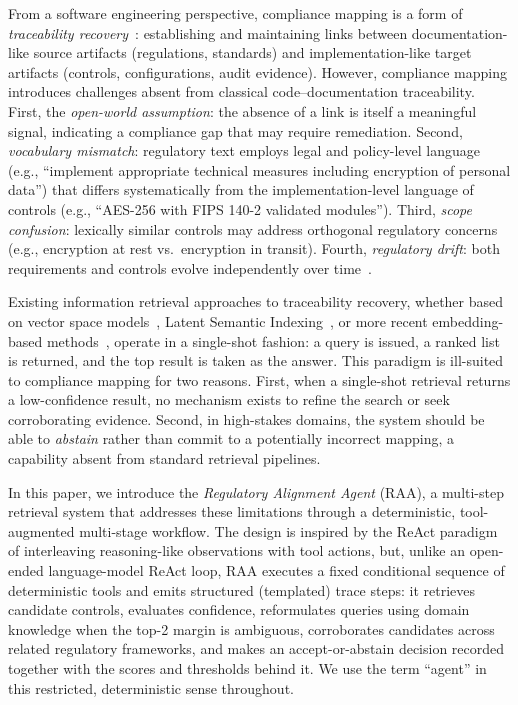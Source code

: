 \documentclass[a4paper,fleqn]{cas-sc}
\begin{document}
From a software engineering perspective, compliance mapping is a form of \emph{traceability recovery}~\citep{Borg2014,Cleland-Huang2014}: establishing and maintaining links between documentation-like source artifacts (regulations, standards) and implementation-like target artifacts (controls, configurations, audit evidence).
However, compliance mapping introduces challenges absent from classical code--documentation traceability.
First, the \emph{open-world assumption}: the absence of a link is itself a meaningful signal, indicating a compliance gap that may require remediation.
Second, \emph{vocabulary mismatch}: regulatory text employs legal and policy-level language (e.g., ``implement appropriate technical measures including encryption of personal data'') that differs systematically from the implementation-level language of controls (e.g., ``AES-256 with FIPS 140-2 validated modules'').
Third, \emph{scope confusion}: lexically similar controls may address orthogonal regulatory concerns (e.g., encryption at rest vs.\ encryption in transit).
Fourth, \emph{regulatory drift}: both requirements and controls evolve independently over time~\citep{Gama2014}.

Existing information retrieval approaches to traceability recovery, whether based on vector space models~\citep{Antoniol2002}, Latent Semantic Indexing~\citep{MarcusMaletic2003}, or more recent embedding-based methods~\citep{Guo2017}, operate in a single-shot fashion: a query is issued, a ranked list is returned, and the top result is taken as the answer.
This paradigm is ill-suited to compliance mapping for two reasons.
First, when a single-shot retrieval returns a low-confidence result, no mechanism exists to refine the search or seek corroborating evidence.
Second, in high-stakes domains, the system should be able to \emph{abstain} rather than commit to a potentially incorrect mapping, a capability absent from standard retrieval pipelines.

In this paper, we introduce the \emph{Regulatory Alignment Agent} (RAA), a multi-step retrieval system that addresses these limitations through a deterministic, tool-augmented multi-stage workflow.
The design is inspired by the ReAct paradigm~\citep{Yao2023} of interleaving reasoning-like observations with tool actions, but, unlike an open-ended language-model ReAct loop, RAA executes a fixed conditional sequence of deterministic tools and emits structured (templated) trace steps: it retrieves candidate controls, evaluates confidence, reformulates queries using domain knowledge when the top-2 margin is ambiguous, corroborates candidates across related regulatory frameworks, and makes an accept-or-abstain decision recorded together with the scores and thresholds behind it. We use the term ``agent'' in this restricted, deterministic sense throughout.
\end{document}
